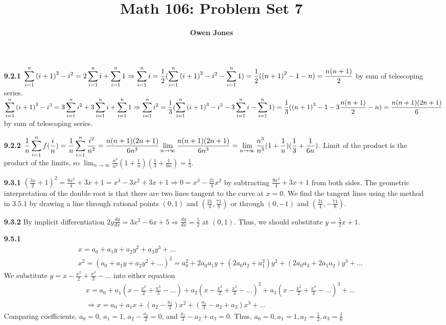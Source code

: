 \documentclass[10pt]{article}
\title{\bf Math 106: Problem Set 7}
\author{\bf Owen Jones}
\begin{document}
\maketitle
\begin{enumerate}
\item [\textbf{9.2.1}] $\displaystyle \sum_{i=1}^{n}{(i+1)}^2-i^2=2\sum_{i=1}^{n}i+\sum_{i=1}^{n}1
\Rightarrow\sum_{i=1}^{n}i=\frac{1}{2}(\sum_{i=1}^{n}{(i+1)}^2-i^2-\sum_{i=1}^{n}1)\\
=\frac{1}{2}({(n+1)}^2-1-n)=\frac{n(n+1)}{2}$ by sum of telescoping series.\\
$\displaystyle \sum_{i=1}^{n}{(i+1)}^3-i^3=3\sum_{i=1}^{n}i^2+3\sum_{i=1}^{n}i+\sum_{i=1}^{n}1
\Rightarrow \sum_{i=1}^{n}i^2=\frac{1}{3}(\sum_{i=1}^{n}{(i+1)}^3-i^3-3\sum_{i=1}^{n}i-\sum_{i=1}^{n}1)\\
=\frac{1}{3}({(n+1)}^3-1-3\frac{n(n+1)}{2}-n)=\frac{n(n+1)(2n+1)}{6}$ by sum of telescoping series.
\item [\textbf{9.2.2}] $\displaystyle \frac{1}{n}\sum_{i=1}^{n}f(\frac{i}{n})=\frac{1}{n}\sum_{i=1}^{n}\frac{i^2}{n^2}=\frac{n(n+1)(2n+1)}{6n^3}\\
\lim_{n\rightarrow\infty}\frac{n(n+1)(2n+1)}{6n^3}=\lim_{n\rightarrow\infty}\frac{n^3}{n^3}(1+\frac{1}{n})(\frac{1}{3}+\frac{1}{6n})$. Limit of the product is the product of the limits, so $\displaystyle\lim_{n\rightarrow\infty}\frac{n^3}{n^3}(1+\frac{1}{n})(\frac{1}{3}+\frac{1}{6n})=\frac{1}{3}$.
\item [\textbf{9.3.1}] ${(\frac{3x}{2}+1)}^2=\frac{9x^2}{4}+3x+1=x^3-3x^2+3x+1\Rightarrow 0=x^3-\frac{21}{4}x^2$ by subtracting $\frac{9x^2}{4}+3x+1$ from both sides. The geometric interpretation of the double root is that there are two lines tangent to the curve at $x=0$. We find the tangent lines using the method in $3.5.1$ by drawing a line through rational points $(0,1)$ and $(\frac{21}{4},\frac{71}{8})$ or through $(0,-1)$ and $(\frac{21}{4},-\frac{71}{8})$.
\item [\textbf{9.3.2}] By implicit differentiation $2y\frac{dy}{dx}=3x^2-6x+5\Rightarrow \frac{dy}{dx}=\frac{5}{2}$ at $(0,1)$. Thus, we should substitute $y=\frac{5}{2}x+1$.
\item [\textbf{9.5.1}] 
\begin{align*}
    &x=a_0+a_1y+a_2y^2+a_3y^3+\ldots\\
    &x^2={(a_0+a_1y+a_2y^2+\ldots)}^2=a_0^2+2a_0a_1y+(2a_0a_2+a_1^2)y^2+(2a_0a_3+2a_1a_2)y^3+\ldots
\end{align*}
We substitute $y=x-\frac{x^2}{2}+\frac{x^3}{3}-\ldots$ into either equation
\begin{align*}
    &x=a_0+a_1(x-\frac{x^2}{2}+\frac{x^3}{3}-\ldots)+a_2{(x-\frac{x^2}{2}+\frac{x^3}{3}-\ldots)}^2+a_3{(x-\frac{x^2}{2}+\frac{x^3}{3}-\ldots)}^3+\ldots\\
    &\Rightarrow x=a_0+a_1x+(a_2-\frac{a_1}{2})x^2+(\frac{a_1}{3}-a_2+a_3)x^3+\ldots
\end{align*}
Comparing coefficients, $a_0=0$, $a_1=1$, $a_2-\frac{a_1}{2}=0$, and $\frac{a_1}{3}-a_2+a_3=0$. Thus, $a_0=0,a_1=1,a_2=\frac{1}{2},a_3=\frac{1}{6}$

\end{enumerate}
\end{document}
